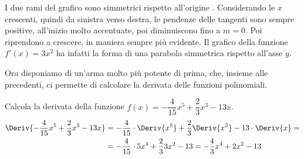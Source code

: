 
I due rami del grafico sono simmetrici rispetto all'origine
. 
Considerando le \(x\) crescenti, quindi da sinistra verso destra, le 
pendenze delle tangenti sono sempre positive, all'inizio molto 
accentuate, poi diminuiscono fino a \(m=0\). Poi riprendono a crescere, 
in maniera sempre più evidente. Il grafico della funzione \(f'(x)=3 x^2\) 
ha infatti la forma di una parabola simmetrica rispetto all'asse \(y\).

Ora disponiamo di un'arma molto più potente di prima, che, insieme alle 
precedenti, ci permette di calcolare la derivata delle funzioni 
polinomiali. 

\begin{esempio}
\label{esem:diff_prodottocostante}
Calcola la derivata della funzione 
\(f(x)=-\dfrac{4}{15}x^5 +\dfrac{2}{3}x^3-13x\).
\begin{align*}
\Deriv{-\dfrac{4}{15}x^5+ \dfrac{2}{3}x^3-13x} &= 
-\dfrac{4}{15} \cdot \Deriv{x^5} + 
 \dfrac{2}{3} \Deriv{x^3} -13 \cdot \Deriv{x}=\\
&=-\dfrac{4}{15} \cdot 5x^4 + \dfrac{2}{3} 3x^2 -13 =
-\dfrac{4}{3} x^4 + 2x^2 -13
\end{align*}
\end{esempio}



